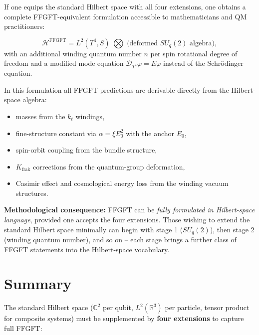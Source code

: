 If one equips the standard Hilbert space with all four extensions, one
obtains a complete FFGFT-equivalent formulation accessible to
mathematicians and QM practitioners:

\begin{equation}
  \mathcal{H}^{\text{FFGFT}}
  = L^2(T^4, S) \;\bigotimes\; \text{(deformed $SU_q(2)$ algebra)},
\end{equation}
with an additional winding quantum number $n$ per spin rotational
degree of freedom and a modified mode equation
$\mathcal{D}_{T^4}\varphi = E \varphi$ instead of the Schrödinger
equation.

In this formulation all FFGFT predictions are derivable directly
from the Hilbert-space algebra:
\begin{itemize}[leftmargin=2em,itemsep=2pt,topsep=2pt]
  \item masses from the $k_t$ windings,
  \item fine-structure constant via $\alpha = \xi E_0^2$ with the anchor $E_0$,
  \item spin-orbit coupling from the bundle structure,
  \item $K_{\text{frak}}$ corrections from the quantum-group
        deformation,
  \item Casimir effect and cosmological energy loss from the winding
        vacuum structures.
\end{itemize}

\textbf{Methodological consequence:} FFGFT can be \emph{fully
formulated in Hilbert-space language}, provided one accepts the four
extensions. Those wishing to extend the standard Hilbert space
minimally can begin with stage 1 ($SU_q(2)$), then stage 2 (winding
quantum number), and so on -- each stage brings a further class of
FFGFT statements into the Hilbert-space vocabulary.

\section{Summary}

The standard Hilbert space ($\mathbb{C}^2$ per qubit, $L^2(\mathbb{R}^3)$
per particle, tensor product for composite systems) must be supplemented
by \textbf{four extensions} to capture full FFGFT:

